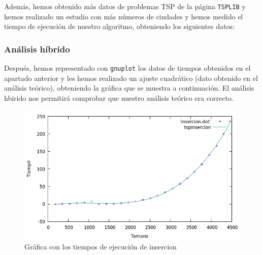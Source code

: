 \documentclass[10pt,a4paper]{article}
\begin{document}
Además, hemos obtenido más datos de problemas TSP de la página \texttt{TSPLIB} y hemos realizado un estudio con más números de ciudades y hemos medido el tiempo de ejecución de nuestro algoritmo, obteniendo los siguientes datos:


 \begin{table}[h!]
 	\centering
 	\footnotesize
 	\caption{Experiencia empírica de inserción}
 \end{table}

\subsubsection*{Análisis híbrido}

Después, hemos representado con \texttt{gnuplot} los datos de tiempos obtenidos en el apartado anterior y les hemos realizado un ajuste cuadrático (dato obtenido en el análisis teórico), obteniendo la gráfica que se muestra a continuación. El análisis hbirido nos permitirá comprobar que nuestro análisis teórico era correcto. 

 \begin{figure}[h!]
 	\centering
 	\includegraphics[scale=0.55]{./Images/insercion.png}
 	\caption{Gráfica con los tiempos de ejecución de insercion}
 \end{figure}
 
\end{document}
